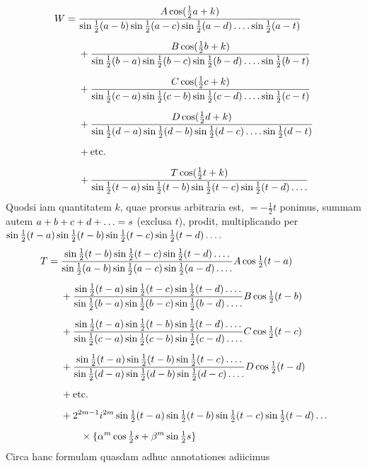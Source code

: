 \begingroup
\renewcommand{\arraystretch}{1.45}
\[
\begin{aligned}
W={}&\frac{A\cos(\tfrac12a+k)}{\sin\tfrac12(a-b)\sin\tfrac12(a-c)\sin\tfrac12(a-d)\mathinner{.\,.\,.\,.}\sin\tfrac12(a-t)}\\[5pt]
&+\frac{B\cos(\tfrac12b+k)}{\sin\tfrac12(b-a)\sin\tfrac12(b-c)\sin\tfrac12(b-d)\mathinner{.\,.\,.\,.}\sin\tfrac12(b-t)}\\[5pt]
&+\frac{C\cos(\tfrac12c+k)}{\sin\tfrac12(c-a)\sin\tfrac12(c-b)\sin\tfrac12(c-d)\mathinner{.\,.\,.\,.}\sin\tfrac12(c-t)}\\[5pt]
&+\frac{D\cos(\tfrac12d+k)}{\sin\tfrac12(d-a)\sin\tfrac12(d-b)\sin\tfrac12(d-c)\mathinner{.\,.\,.\,.}\sin\tfrac12(d-t)}\\[5pt]
&+\text{etc.}\\[5pt]
&+\frac{T\cos(\tfrac12t+k)}{\sin\tfrac12(t-a)\sin\tfrac12(t-b)\sin\tfrac12(t-c)\sin\tfrac12(t-d)\mathinner{.\,.\,.\,.}}
\end{aligned}
\]
Quodsi iam quantitatem $k$, quae prorsus arbitraria est, $=-\tfrac12t$ ponimus,
summam autem $a+b+c+d+\mathinner{.\,.\,.}=s$ (exclusa $t$), prodit, multiplicando per
$\sin\tfrac12(t-a)\sin\tfrac12(t-b)\sin\tfrac12(t-c)\sin\tfrac12(t-d)\mathinner{.\,.\,.\,.}$
\[
\begin{aligned}
T={}&\frac{\sin\tfrac12(t-b)\sin\tfrac12(t-c)\sin\tfrac12(t-d)\mathinner{.\,.\,.\,.}}{\sin\tfrac12(a-b)\sin\tfrac12(a-c)\sin\tfrac12(a-d)\mathinner{.\,.\,.\,.}}A\cos\tfrac12(t-a)\\[5pt]
&+\frac{\sin\tfrac12(t-a)\sin\tfrac12(t-c)\sin\tfrac12(t-d)\mathinner{.\,.\,.\,.}}{\sin\tfrac12(b-a)\sin\tfrac12(b-c)\sin\tfrac12(b-d)\mathinner{.\,.\,.\,.}}B\cos\tfrac12(t-b)\\[5pt]
&+\frac{\sin\tfrac12(t-a)\sin\tfrac12(t-b)\sin\tfrac12(t-d)\mathinner{.\,.\,.\,.}}{\sin\tfrac12(c-a)\sin\tfrac12(c-b)\sin\tfrac12(c-d)\mathinner{.\,.\,.\,.}}C\cos\tfrac12(t-c)\\[5pt]
&+\frac{\sin\tfrac12(t-a)\sin\tfrac12(t-b)\sin\tfrac12(t-c)\mathinner{.\,.\,.\,.}}{\sin\tfrac12(d-a)\sin\tfrac12(d-b)\sin\tfrac12(d-c)\mathinner{.\,.\,.\,.}}D\cos\tfrac12(t-d)\\[5pt]
&+\text{etc.}\\[5pt]
&+2^{2m-1}i^{2m}\sin\tfrac12(t-a)\sin\tfrac12(t-b)\sin\tfrac12(t-c)\sin\tfrac12(t-d)\mathinner{.\,.\,.}\\[5pt]
&\qquad\times\{\alpha^m\cos\tfrac12s+\beta^m\sin\tfrac12s\}
\end{aligned}
\]
Circa hanc formulam quasdam adhuc annotationes adiicimus

